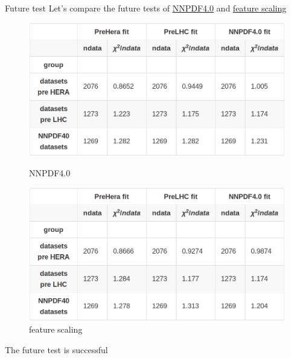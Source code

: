 \documentclass[aspectratio=169,11pt]{beamer}
\begin{document}
\begin{frame}[t]{Future test}
  Let's compare the future tests of {\color{blue} \underline{\href{https://vp.nnpdf.science/ArCroD6xRxmTAGHSBJoD3Q==/}{NNPDF4.0}}} and {\color{blue} \underline{\href{https://vp.nnpdf.science/TVyAUeiNTk26IMYAfRNqLw==}{feature scaling}}} 
  \begin{center}
    \begin{figure}
        \includegraphics[width=1\textwidth]{figures/futuretest_nnpdf40.png}
        \captionsetup{labelformat=empty}
        \caption{NNPDF4.0}
      \endminipage\hfill
        \includegraphics[width=1\textwidth]{figures/futuretest_feature.png}
        \captionsetup{labelformat=empty}
        \caption{feature scaling}
      \endminipage
    \end{figure}
    \vspace*{1em}
     {The future test is successful}
  \end{center}
\end{frame}
\end{document}
